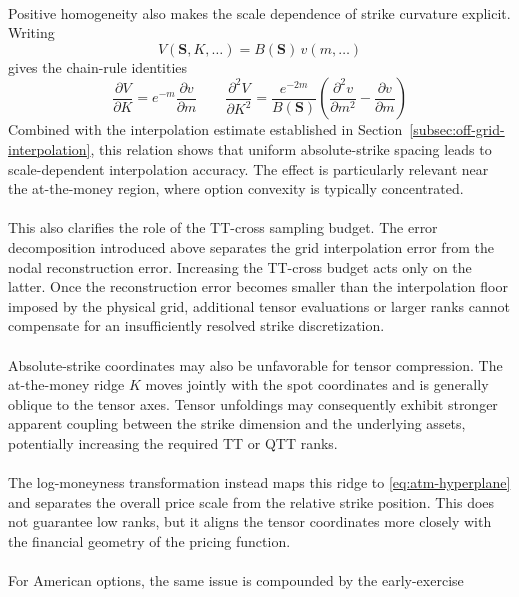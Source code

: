 \documentclass{article}
\numberwithin{equation}{subsection}
\theoremstyle{definition}
\theoremstyle{remark}
\begin{document}
\\
Positive homogeneity also makes the scale dependence of strike curvature
explicit. Writing
\begin{equation}
V(\boldsymbol{S},K,\ldots) = B(\boldsymbol{S})\,v(m,\ldots)
\label{eq:normalized-price-preview}
\end{equation}
gives the chain-rule identities
\begin{equation}
\frac{\partial V}{\partial K}
=
e^{-m}\frac{\partial v}{\partial m}
\qquad
\frac{\partial^2V}{\partial K^2}
=
\frac{e^{-2m}}{B(\boldsymbol{S})}
\left(
\frac{\partial^2v}{\partial m^2}
-
\frac{\partial v}{\partial m}
\right)
\label{eq:normalized-strike-derivatives}
\end{equation}
Combined with the interpolation estimate established in
Section~\ref{subsec:off-grid-interpolation},
this relation shows that uniform absolute-strike spacing leads to
scale-dependent interpolation accuracy. The effect is particularly relevant
near the at-the-money region, where option convexity is typically concentrated. \\
\\
This also clarifies the role of the TT-cross sampling budget. The error
decomposition introduced above separates the grid interpolation error from the
nodal reconstruction error. Increasing the TT-cross budget acts only on the
latter. Once the reconstruction error becomes smaller than the interpolation
floor imposed by the physical grid, additional tensor evaluations or larger
ranks cannot compensate for an insufficiently resolved strike discretization. \\
\\
Absolute-strike coordinates may also be unfavorable for tensor compression. The
at-the-money ridge $K$
moves jointly with the spot coordinates and is generally oblique to the tensor
axes. Tensor unfoldings may consequently exhibit stronger apparent coupling
between the strike dimension and the underlying assets, potentially increasing
the required TT or QTT ranks. \\
\\
The log-moneyness transformation instead maps this ridge to
\eqref{eq:atm-hyperplane}
and separates the overall price scale from the relative strike position. This
does not guarantee low ranks, but it aligns the tensor coordinates more closely
with the financial geometry of the pricing function.\\
\\
For American options, the same issue is compounded by the early-exercise
\end{document}
